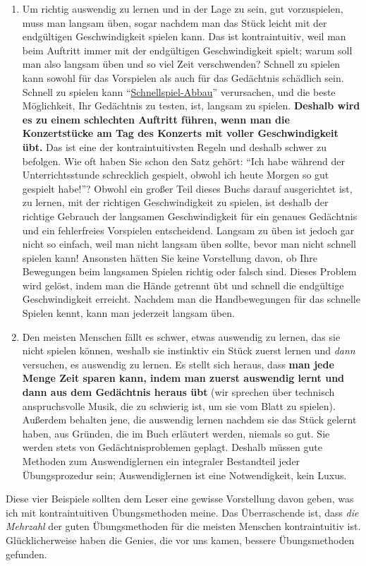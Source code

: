 \begin{enumerate}[label={\arabic*.}]
\item Um richtig auswendig zu lernen und in der Lage zu sein, gut vorzuspielen, muss man langsam üben, sogar nachdem man das Stück leicht mit der endgültigen Geschwindigkeit spielen kann.
Das ist kontraintuitiv, weil man beim Auftritt immer mit der endgültigen Geschwindigkeit spielt; warum soll man also langsam üben und so viel Zeit verschwenden?
Schnell zu spielen kann sowohl für das Vorspielen als auch für das Gedächtnis schädlich sein.
Schnell zu spielen kann \enquote{\hyperref[fpd]{Schnellspiel-Abbau}} verursachen, und die beste Möglichkeit, Ihr Gedächtnis zu testen, ist, langsam zu spielen.
\textbf{Deshalb wird es zu einem schlechten Auftritt führen, wenn man die Konzertstücke am Tag des Konzerts mit voller Geschwindigkeit übt.}
Das ist eine der kontraintuitivsten Regeln und deshalb schwer zu befolgen.
Wie oft haben Sie schon den Satz gehört: \enquote{Ich habe während der Unterrichtsstunde schrecklich gespielt, obwohl ich heute Morgen so gut gespielt habe!}?
Obwohl ein großer Teil dieses Buchs darauf ausgerichtet ist, zu lernen, mit der richtigen Geschwindigkeit zu spielen, ist deshalb der richtige Gebrauch der langsamen Geschwindigkeit für ein genaues Gedächtnis und ein fehlerfreies Vorspielen entscheidend.
Langsam zu üben ist jedoch gar nicht so einfach, weil man nicht langsam üben sollte, bevor man nicht schnell spielen kann!
Ansonsten hätten Sie keine Vorstellung davon, ob Ihre Bewegungen beim langsamen Spielen richtig oder falsch sind.
Dieses Problem wird gelöst, indem man die Hände getrennt übt und schnell die endgültige Geschwindigkeit erreicht.
Nachdem man die Handbewegungen für das schnelle Spielen kennt, kann man jederzeit langsam üben.

\item Den meisten Menschen fällt es schwer, etwas auswendig zu lernen, das sie nicht spielen können, weshalb sie instinktiv ein Stück zuerst lernen und \textit{dann} versuchen, es auswendig zu lernen.
Es stellt sich heraus, dass \textbf{man jede Menge Zeit sparen kann, indem man zuerst auswendig lernt und dann aus dem Gedächtnis heraus übt} (wir sprechen über technisch anspruchsvolle Musik, die zu schwierig ist, um sie vom Blatt zu spielen).
Außerdem behalten jene, die auswendig lernen nachdem sie das Stück gelernt haben, aus Gründen, die im Buch erläutert werden, niemals so gut.
Sie werden stets von Gedächtnisproblemen geplagt.
Deshalb müssen gute Methoden zum Auswendiglernen ein integraler Bestandteil jeder Übungsprozedur sein; Auswendiglernen ist eine Notwendigkeit, kein Luxus.

 \end{enumerate}
Diese vier Beispiele sollten dem Leser eine gewisse Vorstellung davon geben, was ich mit kontraintuitiven Übungsmethoden meine.
Das Überraschende ist, dass \textit{die Mehrzahl} der guten Übungsmethoden für die meisten Menschen kontraintuitiv ist.
Glücklicherweise haben die Genies, die vor uns kamen, bessere Übungsmethoden gefunden.

